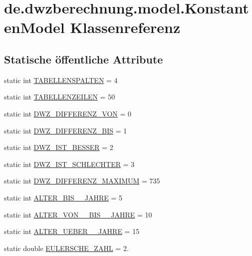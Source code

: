 \hypertarget{classde_1_1dwzberechnung_1_1model_1_1_konstanten_model}{}\section{de.\+dwzberechnung.\+model.\+Konstanten\+Model Klassenreferenz}
\label{classde_1_1dwzberechnung_1_1model_1_1_konstanten_model}
\subsection*{Statische öffentliche Attribute}
\begin{DoxyCompactItemize}
\item 
static int \hyperlink{classde_1_1dwzberechnung_1_1model_1_1_konstanten_model_aa3ebc479c8a87c069877c67bd55f065e}{T\+A\+B\+E\+L\+L\+E\+N\+S\+P\+A\+L\+T\+EN} = 4
\item 
static int \hyperlink{classde_1_1dwzberechnung_1_1model_1_1_konstanten_model_a6364795a819323a058fbce805edb1a95}{T\+A\+B\+E\+L\+L\+E\+N\+Z\+E\+I\+L\+EN} = 50
\item 
static int \hyperlink{classde_1_1dwzberechnung_1_1model_1_1_konstanten_model_a2c0718b863e83582f5b8bc240b2d5d28}{D\+W\+Z\+\_\+\+D\+I\+F\+F\+E\+R\+E\+N\+Z\+\_\+\+V\+ON} = 0
\item 
static int \hyperlink{classde_1_1dwzberechnung_1_1model_1_1_konstanten_model_a55672cc3b224c8a859ec57b5ba5ec097}{D\+W\+Z\+\_\+\+D\+I\+F\+F\+E\+R\+E\+N\+Z\+\_\+\+B\+IS} = 1
\item 
static int \hyperlink{classde_1_1dwzberechnung_1_1model_1_1_konstanten_model_ad79a507837daed786057f3e4faeb722d}{D\+W\+Z\+\_\+\+I\+S\+T\+\_\+\+B\+E\+S\+S\+ER} = 2
\item 
static int \hyperlink{classde_1_1dwzberechnung_1_1model_1_1_konstanten_model_aff0e54f44ff44ad109a924680d837c31}{D\+W\+Z\+\_\+\+I\+S\+T\+\_\+\+S\+C\+H\+L\+E\+C\+H\+T\+ER} = 3
\item 
static int \hyperlink{classde_1_1dwzberechnung_1_1model_1_1_konstanten_model_a48ec5a12ce2df6b1a557ec2529370b9e}{D\+W\+Z\+\_\+\+D\+I\+F\+F\+E\+R\+E\+N\+Z\+\_\+\+M\+A\+X\+I\+M\+UM} = 735
\item 
static int \hyperlink{classde_1_1dwzberechnung_1_1model_1_1_konstanten_model_ac67bf60f8307e39d8a738aed676b3a7f}{A\+L\+T\+E\+R\+\_\+\+B\+I\+S\+\_\+\_\+\+J\+A\+H\+RE} = 5
\item 
static int \hyperlink{classde_1_1dwzberechnung_1_1model_1_1_konstanten_model_a62da6fffccad91d9c3b8ee133eb14142}{A\+L\+T\+E\+R\+\_\+\+V\+O\+N\+\_\+\_\+\+B\+I\+S\+\_\+\_\+\+J\+A\+H\+RE} = 10
\item 
static int \hyperlink{classde_1_1dwzberechnung_1_1model_1_1_konstanten_model_a8ed78e990c4682f4473d8ddf3f7dfa1e}{A\+L\+T\+E\+R\+\_\+\+U\+E\+B\+E\+R\+\_\+\_\+\+J\+A\+H\+RE} = 15
\item 
static double \hyperlink{classde_1_1dwzberechnung_1_1model_1_1_konstanten_model_a46f3fcc0c6de749360790f38636b7c75}{E\+U\+L\+E\+R\+S\+C\+H\+E\+\_\+\+Z\+A\+HL} = 2.
\end{DoxyCompactItemize}


